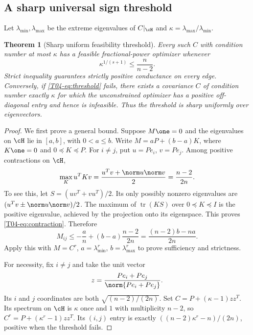 \documentclass[11pt,a4paper]{article}
\newtheorem{theorem}{Theorem}[section]
\theoremstyle{definition}\newtheorem{definition}[theorem]{Definition}
\theoremstyle{remark}\newtheorem{remark}[theorem]{Remark}
\DeclareMathOperator{\tr}{tr}\DeclareMathOperator{\supp}{supp}\DeclareMathOperator{\TV}{TV}
\numberwithin{equation}{section}
\begin{document}
\subsection{A sharp universal sign threshold}\label{T04-sec-4}
Let $\lambda_{\min},\lambda_{\max}$ be the extreme eigenvalues of $C|_{\cH}$ and $\kappa=\lambda_{\max}/\lambda_{\min}$.
\begin{theorem}[Sharp uniform feasibility threshold]\label{T04-thm:threshold}
Every such $C$ with condition number at most $\kappa$ has a feasible fractional-power optimizer whenever
\begin{equation}\label{T04-eq:threshold}
 \kappa^{1/(s+1)}\le\frac n{n-2}.
\end{equation}
Strict inequality guarantees strictly positive conductance on every edge. Conversely, if \eqref{T04-eq:threshold} fails, there exists a covariance $C$ of condition number exactly $\kappa$ for which the unconstrained optimizer has a positive off-diagonal entry and hence is infeasible. Thus the threshold is sharp uniformly over eigenvectors.
\end{theorem}
\begin{proof}
We first prove a general bound. Suppose $M\one=0$ and the eigenvalues on $\cH$ lie in $[a,b]$, with $0<a\le b$. Write $M=aP+(b-a)K$, where $K\one=0$ and $0\preceq K\preceq P$. For $i\ne j$, put $u=Pe_i$, $v=Pe_j$. Among positive contractions on $\cH$,
\begin{equation}\label{T04-eq:contraction}
 \max_K u^TKv=\frac{u^Tv+\norm u\norm v}{2}=\frac{n-2}{2n}.
\end{equation}
To see this, let $S=(uv^T+vu^T)/2$. Its only possibly nonzero eigenvalues are $(u^Tv\pm\norm u\norm v)/2$. The maximum of $\tr(KS)$ over $0\preceq K\preceq I$ is the positive eigenvalue, achieved by the projection onto its eigenspace. This proves \eqref{T04-eq:contraction}. Therefore
\begin{equation}\label{T04-eq:entry}
 M_{ij}\le -\frac an+(b-a)\frac{n-2}{2n}
 =\frac{(n-2)b-na}{2n}.
\end{equation}
Apply this with $M=C^r$, $a=\lambda_{\min}^r$, $b=\lambda_{\max}^r$ to prove sufficiency and strictness.

For necessity, fix $i\ne j$ and take the unit vector
\[
 z=\frac{Pe_i+Pe_j}{\norm{Pe_i+Pe_j}}.
\]
Its $i$ and $j$ coordinates are both $\sqrt{(n-2)/(2n)}$. Set
$C=P+(\kappa-1)zz^T$. Its spectrum on $\cH$ is $\kappa$ once and $1$ with multiplicity $n-2$, so
$C^r=P+(\kappa^r-1)zz^T$. Its $(i,j)$ entry is exactly $((n-2)\kappa^r-n)/(2n)$, positive when the threshold fails.
\end{proof}
\end{document}
